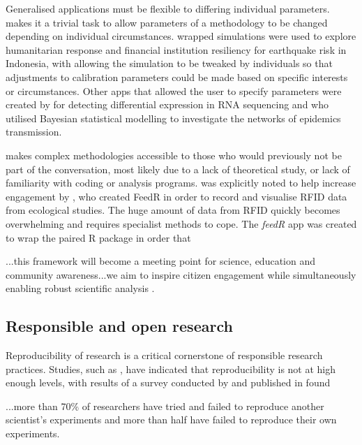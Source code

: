 Generalised applications must be flexible to differing individual parameters.   makes it a trivial task to allow parameters of a methodology to be changed depending on individual circumstances.   wrapped simulations were used to explore humanitarian response and financial institution resiliency for earthquake risk in Indonesia, with \citet{hartell_earthquake_2014} allowing the simulation to be tweaked by individuals so that adjustments to calibration parameters could be made based on specific interests or circumstances.  Other apps that allowed the user to specify parameters were created by \citet{zhou_robustly_2014} for detecting differential expression in RNA sequencing and \citet{yin_bayesian_2014} who utilised Bayesian statistical modelling to investigate the networks of epidemics transmission.  

 makes complex methodologies accessible to those who would previously not be part of the conversation, most likely due to a lack of theoretical study, or lack of familiarity with coding or analysis programs.   was explicitly noted to help increase engagement by \citet{lazerte_feedr_2017}, who created FeedR in order to record and visualise RFID data from ecological studies.  The huge amount of data from RFID quickly becomes overwhelming and requires specialist  methods to cope.  The \textit{feedR}  app was created to wrap the paired R package in order that

\begin{displayquote}
	...this framework will become a meeting point for science, education and community awareness...we aim to inspire citizen engagement while simultaneously enabling robust scientific analysis \citep{lazerte_feedr_2017}.
\end{displayquote}


\subsection{Responsible and open research}

Reproducibility of research is a critical cornerstone of responsible research practices.  Studies, such as \citet{munafo_manifesto_2017}, have indicated that reproducibility is not at high enough levels, with results of a survey conducted by \citet{baker_1500_2016} and published in  found

\begin{displayquote}
	...more than 70\% of researchers have tried and failed to reproduce another scientist's experiments and more than half have failed to reproduce their own experiments.
\end{displayquote}

